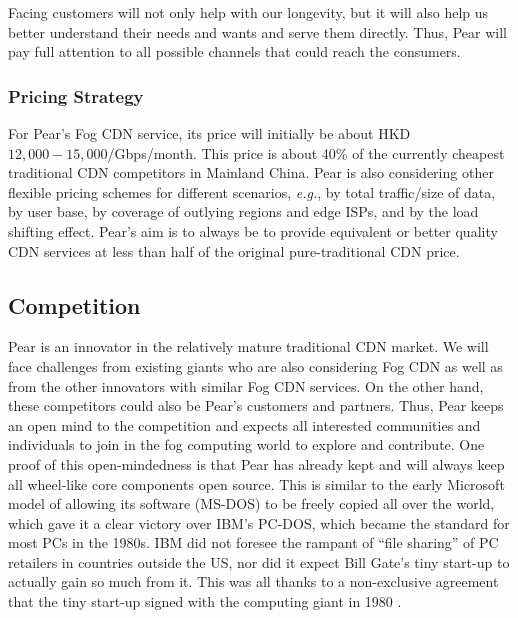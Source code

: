 Facing customers will not only help with our longevity, but it will also help us better understand their needs and wants and serve them directly. Thus, Pear will pay full attention to all possible channels that could reach the consumers.

\subsubsection{Pricing Strategy}
For Pear's Fog CDN service, its price will initially be about HKD~$12,000-15,000$/Gbps/month. This price is about 40\% of the currently cheapest traditional CDN competitors in Mainland China. Pear is also considering other flexible pricing schemes for different scenarios, {\em e.g.}, by total traffic/size of data, by user base, by coverage of outlying regions and edge ISPs, and by the load shifting effect. Pear's aim is to always be to provide equivalent or better quality CDN services at less than half of the original pure-traditional CDN price. 

\subsection{Competition}
Pear is an innovator in the relatively mature traditional CDN market. We will face challenges from existing giants who are also considering Fog CDN as well as from the other innovators with similar Fog CDN services. On the other hand, these competitors could also be Pear's customers and partners. Thus, Pear keeps an open mind to the competition and expects all interested communities and individuals to join in the fog computing world to explore and contribute. One proof of this open-mindedness is that Pear has already kept and will always keep all wheel-like core components open source. This is similar to the early Microsoft model of allowing its software (MS-DOS) to be freely copied all over the world, which gave it a clear victory over IBM's PC-DOS, which became the standard for most PCs in the 1980s. IBM did not foresee the rampant of ``file sharing'' of PC retailers in countries outside the US, nor did it expect Bill Gate's tiny start-up to actually gain so much from it. This was all thanks to a non-exclusive agreement that the tiny start-up signed with the computing giant in 1980 \cite{ms-ibm-dos}. 

